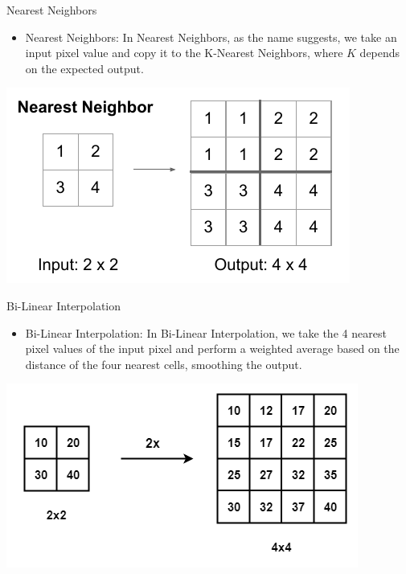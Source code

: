 \documentclass[default, aspectratio=169]{beamer}
\begin{document}
	
	\begin{frame}{Nearest Neighbors}
		\vspace{0.5cm}
		\begin{itemize}
			\item {Nearest Neighbors}: In Nearest Neighbors, as the name suggests, we take an input pixel value and copy it to the K-Nearest Neighbors, where \( K \) depends on the expected output.
		\end{itemize}
		
		\centering
		\includegraphics[keepaspectratio, scale=0.4]{pic/Upsamlpe_1.png}
	\end{frame}

	
	\begin{frame}{Bi-Linear Interpolation}
		\vspace{0.5cm}
		\begin{itemize}
			\item {Bi-Linear Interpolation}: In Bi-Linear Interpolation, we take the 4 nearest pixel values of the input pixel and perform a weighted average based on the distance of the four nearest cells, smoothing the output.
		\end{itemize}
		
		\centering
		\includegraphics[keepaspectratio, scale=0.4]{pic/Upsamlpe_2.png}
		
	\end{frame}
	
\end{document}
